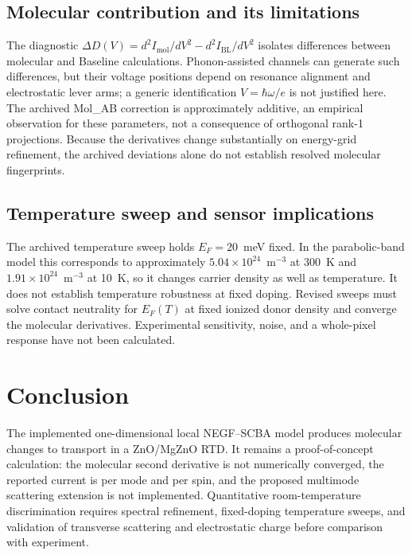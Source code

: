 \documentclass[conference]{IEEEtran}
\begin{document}
\subsection{Molecular contribution and its limitations}
The diagnostic $\Delta D(V)=d^2I_{\mathrm{mol}}/dV^2-d^2I_{\mathrm{BL}}/dV^2$ isolates differences between molecular and Baseline calculations. Phonon-assisted channels can generate such differences, but their voltage positions depend on resonance alignment and electrostatic lever arms; a generic identification $V=\hbar\omega/e$ is not justified here. The archived Mol\_AB correction is approximately additive, an empirical observation for these parameters, not a consequence of orthogonal rank-1 projections. Because the derivatives change substantially on energy-grid refinement, the archived deviations alone do not establish resolved molecular fingerprints.

\subsection{Temperature sweep and sensor implications}
The archived temperature sweep holds $E_F=20$~meV fixed. In the parabolic-band model this corresponds to approximately $5.04\times10^{24}$~m$^{-3}$ at 300~K and $1.91\times10^{24}$~m$^{-3}$ at 10~K, so it changes carrier density as well as temperature. It does not establish temperature robustness at fixed doping. Revised sweeps must solve contact neutrality for $E_F(T)$ at fixed ionized donor density and converge the molecular derivatives. Experimental sensitivity, noise, and a whole-pixel response have not been calculated.

\section{Conclusion}
The implemented one-dimensional local NEGF--SCBA model produces molecular changes to transport in a ZnO/MgZnO RTD. It remains a proof-of-concept calculation: the molecular second derivative is not numerically converged, the reported current is per mode and per spin, and the proposed multimode scattering extension is not implemented. Quantitative room-temperature discrimination requires spectral refinement, fixed-doping temperature sweeps, and validation of transverse scattering and electrostatic charge before comparison with experiment.
\end{document}
